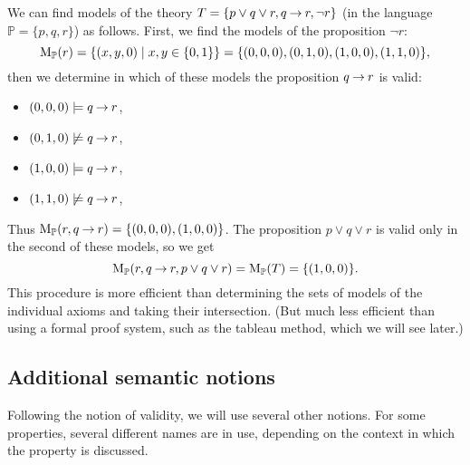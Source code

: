 \begin{example}
    We can find models of the theory $T = \{p \lor q \lor r, q \mathbin{\rightarrow} r, \neg r\}$ (in the language $\mathbb{P} = \{p, q, r\}$) as follows. First, we find the models of the proposition $\neg r$:
    $$
    \operatorname{M}_\mathbb{P}(r) = \{(x, y, 0) \mid x, y \in \{0,1\}\} = \{(0,0,0),(0,1,0),(1,0,0),(1,1,0)\},
    $$
    then we determine in which of these models the proposition $q \mathbin{\rightarrow} r$ is valid: 
    \begin{itemize}
        \item $(0,0,0) \models q \mathbin{\rightarrow} r$,
        \item $(0,1,0) \not\models q \mathbin{\rightarrow} r$,
        \item $(1,0,0) \models q \mathbin{\rightarrow} r$,
        \item $(1,1,0) \not\models q \mathbin{\rightarrow} r$,
    \end{itemize}  
    Thus $\operatorname{M}_\mathbb{P}(r, q \mathbin{\rightarrow} r) = \{(0,0,0),(1,0,0)\}$. The proposition $p \lor q \lor r$ is valid only in the second of these models, so we get
    $$
    \operatorname{M}_\mathbb{P}(r, q \mathbin{\rightarrow} r, p \lor q \lor r) = \operatorname{M}_\mathbb{P}(T) = \{(1,0,0)\}.
    $$
    This procedure is more efficient than determining the sets of models of the individual axioms and taking their intersection. (But much less efficient than using a formal proof system, such as the tableau method, which we will see later.)
\end{example}


\subsection{Additional semantic notions}

Following the notion of validity, we will use several other notions. For some properties, several different names are in use, depending on the context in which the property is discussed.

